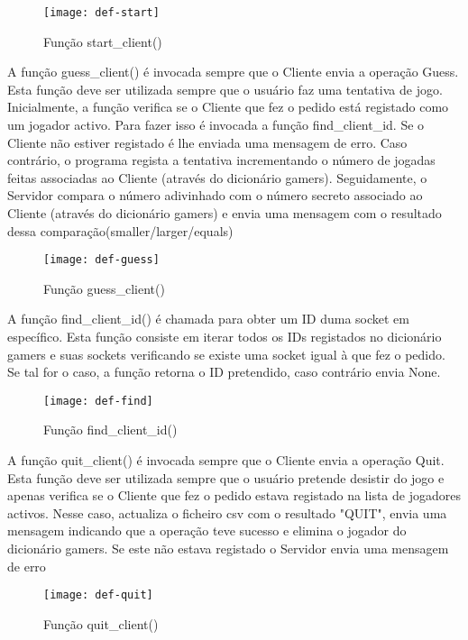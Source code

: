 \begin{figure}[H]
	\centering
	\texttt{[image: def-start]}
	\caption{Função start\_client()\\}
	\label{fig:def-start}
\end{figure} 

A função guess\_client() é invocada sempre que o Cliente envia a operação Guess. Esta função deve ser utilizada sempre que o usuário faz uma tentativa de jogo.
Inicialmente, a função verifica se o Cliente que fez o pedido está registado como um jogador activo. Para fazer isso é invocada a função find\_client\_id.
Se o Cliente não estiver registado é lhe enviada uma mensagem de erro. Caso contrário, o programa regista a tentativa incrementando o número de jogadas feitas associadas ao Cliente (através do dicionário gamers).
Seguidamente, o Servidor compara o número adivinhado com o número secreto associado ao Cliente (através do dicionário gamers) e envia uma mensagem com o resultado dessa comparação(smaller/larger/equals)

\begin{figure}[H]
	\centering
	\texttt{[image: def-guess]}
	\caption{Função guess\_client()\\}
	\label{fig:def-guess}
\end{figure} 

A função find\_client\_id() é chamada para obter um ID duma socket em específico. Esta função consiste em iterar todos os IDs registados no dicionário gamers e suas sockets verificando se existe uma socket igual à que fez o pedido. Se tal for o caso, a função retorna o ID pretendido, caso contrário envia None.

\begin{figure}[H]
	\centering
	\texttt{[image: def-find]}
	\caption{Função find\_client\_id()\\}
	\label{fig:def-find}
\end{figure} 

A função quit\_client() é invocada sempre que o Cliente envia a operação Quit. Esta função deve ser utilizada sempre que o usuário pretende desistir do jogo e apenas verifica se o Cliente que fez o pedido estava registado na lista de jogadores activos. 
Nesse caso, actualiza o ficheiro csv com o resultado "QUIT", envia uma mensagem indicando que a operação teve sucesso e elimina o jogador do dicionário gamers. Se este não estava registado o Servidor envia uma mensagem de erro

\begin{figure}[H]
	\centering
	\texttt{[image: def-quit]}
	\caption{Função quit\_client()\\}
	\label{fig:def-quit}
\end{figure} 

